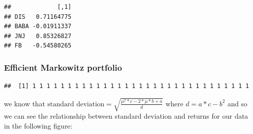 \documentclass[]{article}
\newenvironment{Shaded}{\begin{snugshade}}{\end{snugshade}}
\newcommand{\KeywordTok}[1]{\textcolor[rgb]{0.13,0.29,0.53}{\textbf{#1}}}
\newcommand{\DataTypeTok}[1]{\textcolor[rgb]{0.13,0.29,0.53}{#1}}
\newcommand{\DecValTok}[1]{\textcolor[rgb]{0.00,0.00,0.81}{#1}}
\newcommand{\FloatTok}[1]{\textcolor[rgb]{0.00,0.00,0.81}{#1}}
\newcommand{\StringTok}[1]{\textcolor[rgb]{0.31,0.60,0.02}{#1}}
\newcommand{\ControlFlowTok}[1]{\textcolor[rgb]{0.13,0.29,0.53}{\textbf{#1}}}
\newcommand{\OperatorTok}[1]{\textcolor[rgb]{0.81,0.36,0.00}{\textbf{#1}}}
\newcommand{\NormalTok}[1]{#1}
\begin{document}
\begin{verbatim}
##             [,1]
## DIS   0.71164775
## BABA -0.01911337
## JNJ   0.85326827
## FB   -0.54580265
\end{verbatim}

\subsubsection{Efficient Markowitz
portfolio}\label{efficient-markowitz-portfolio}

\begin{Shaded}
\end{Shaded}

\begin{verbatim}
##  [1] 1 1 1 1 1 1 1 1 1 1 1 1 1 1 1 1 1 1 1 1 1 1 1 1 1 1 1 1 1 1 1
\end{verbatim}

we know that
\(\text{standard deviation} = \sqrt{\frac{\mu^2 * c - 2* \mu *b + a}{d}}\)
where \(d = a*c - b^2\) and so we can see the relationship between
standard deviation and returns for our data in the following figure:
\end{document}
